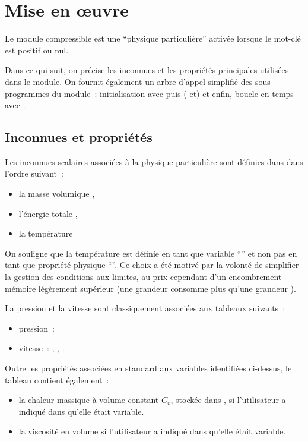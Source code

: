 \section*{Mise en \oe uvre}

Le module compressible est une ``physique particuli\`ere'' activ\'ee lorsque le
mot-cl\'e  est positif ou nul.

Dans ce qui suit, on pr\'ecise les inconnues et les propri\'et\'es
principales utilis\'ees dans le module.
On fournit \'egalement un arbre d'appel simplifi\'e des sous-programmes du
module~: initialisation avec  puis ( et)  et
enfin, boucle en temps avec .


\subsection*{Inconnues et propri\'et\'es}

Les  inconnues scalaires associ\'ees \`a la physique
particuli\`ere sont d\'efinies dans  dans l'ordre
suivant~:
\begin{itemize}
\item la masse volumique ,
\item l'énergie totale   ,
\item la température     
\end{itemize}

On souligne que la temp\'erature est d\'efinie en tant que variable ``'' et
non pas en tant que propri\'et\'e physique ``''. Ce choix a \'et\'e
motiv\'e par la volont\'e de simplifier la gestion des conditions aux limites,
au prix cependant d'un encombrement m\'emoire l\'eg\`erement sup\'erieur (une
grandeur  consomme plus qu'une grandeur ).

La pression et la vitesse sont classiquement associ\'ees aux tableaux suivants~:
\begin{itemize}
\item pression~: 
\item vitesse~: , , .
\end{itemize}


\bigskip
Outre les propri\'et\'es associ\'ees en standard aux variables
identifi\'ees ci-dessus, le
tableau  contient \'egalement~:
 \begin{itemize}
\item la chaleur massique à volume constant $C_v$, stock\'ee dans
,
      si  l'utilisateur a indiqué dans  qu'elle \'etait variable.
\item la viscosité en volume 
      si  l'utilisateur a indiqué dans  qu'elle \'etait variable.
\end{itemize}


